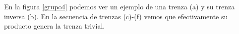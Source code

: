 En la figura \ref{grupo4} podemos ver un ejemplo de una trenza (a) y su trenza inversa (b). En la secuencia de trenzas (c)-(f) vemos que efectivamente su producto genera la trenza trivial.\\
   \begin{figure}[h!]
   	\centering
   	

\end{figure}
